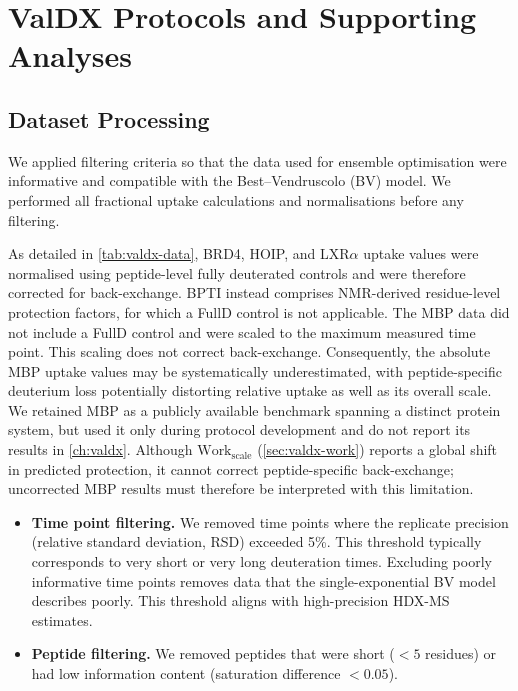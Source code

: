 \chapter{ValDX Protocols and Supporting Analyses}
\label{app:valdx-protocols}

\section{Dataset Processing}
\label{app:valdx-hdx-data}

We applied filtering criteria so that the data used for ensemble optimisation were informative and compatible with the Best--Vendruscolo (BV) model.\supercite{bestStructuralInterpretationHydrogen2006} We performed all fractional uptake calculations and normalisations before any filtering.

As detailed in \cref{tab:valdx-data}, BRD4, HOIP, and LXR$\alpha$ uptake values were normalised using peptide-level fully deuterated controls and were therefore corrected for back-exchange. BPTI instead comprises NMR-derived residue-level protection factors, for which a FullD control is not applicable. The MBP data did not include a FullD control and were scaled to the maximum measured time point. This scaling does not correct back-exchange. Consequently, the absolute MBP uptake values may be systematically underestimated, with peptide-specific deuterium loss potentially distorting relative uptake as well as its overall scale. We retained MBP as a publicly available benchmark spanning a distinct protein system, but used it only during protocol development and do not report its results in \cref{ch:valdx}. Although $\text{Work}_\text{scale}$ (\cref{sec:valdx-work}) reports a global shift in predicted protection, it cannot correct peptide-specific back-exchange; uncorrected MBP results must therefore be interpreted with this limitation.

\begin{itemize}
    \item \textbf{Time point filtering.} We removed time points where the replicate precision (relative standard deviation, RSD) exceeded 5\%. This threshold typically corresponds to very short or very long deuteration times. Excluding poorly informative time points removes data that the single-exponential BV model describes poorly. This threshold aligns with high-precision HDX-MS estimates.\supercite{hudgensInterlaboratoryComparisonHydrogenDeuterium2019}
    \item \textbf{Peptide filtering.} We removed peptides that were short ($<5$ residues) or had low information content (saturation difference $<0.05$).
\end{itemize}

